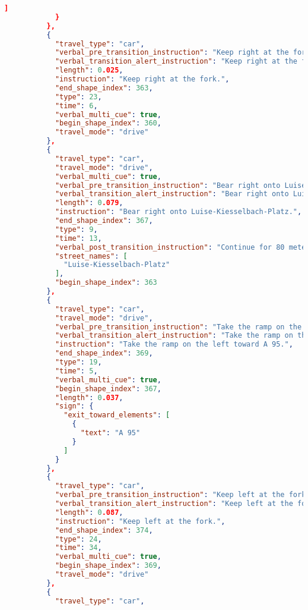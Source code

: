 \begin{lstlisting}[language=json,breaklines=true]
              ]
            }
          },
          {
            "travel_type": "car",
            "verbal_pre_transition_instruction": "Keep right at the fork. Then Bear right onto Luise-Kiesselbach-Platz.",
            "verbal_transition_alert_instruction": "Keep right at the fork.",
            "length": 0.025,
            "instruction": "Keep right at the fork.",
            "end_shape_index": 363,
            "type": 23,
            "time": 6,
            "verbal_multi_cue": true,
            "begin_shape_index": 360,
            "travel_mode": "drive"
          },
          {
            "travel_type": "car",
            "travel_mode": "drive",
            "verbal_multi_cue": true,
            "verbal_pre_transition_instruction": "Bear right onto Luise-Kiesselbach-Platz. Then Take the ramp on the left toward A 95.",
            "verbal_transition_alert_instruction": "Bear right onto Luise-Kiesselbach-Platz.",
            "length": 0.079,
            "instruction": "Bear right onto Luise-Kiesselbach-Platz.",
            "end_shape_index": 367,
            "type": 9,
            "time": 13,
            "verbal_post_transition_instruction": "Continue for 80 meters.",
            "street_names": [
              "Luise-Kiesselbach-Platz"
            ],
            "begin_shape_index": 363
          },
          {
            "travel_type": "car",
            "travel_mode": "drive",
            "verbal_pre_transition_instruction": "Take the ramp on the left toward A 95. Then Keep left at the fork.",
            "verbal_transition_alert_instruction": "Take the ramp on the left toward A 95.",
            "instruction": "Take the ramp on the left toward A 95.",
            "end_shape_index": 369,
            "type": 19,
            "time": 5,
            "verbal_multi_cue": true,
            "begin_shape_index": 367,
            "length": 0.037,
            "sign": {
              "exit_toward_elements": [
                {
                  "text": "A 95"
                }
              ]
            }
          },
          {
            "travel_type": "car",
            "verbal_pre_transition_instruction": "Keep left at the fork. Then Take the B 2 ramp on the left.",
            "verbal_transition_alert_instruction": "Keep left at the fork.",
            "length": 0.087,
            "instruction": "Keep left at the fork.",
            "end_shape_index": 374,
            "type": 24,
            "time": 34,
            "verbal_multi_cue": true,
            "begin_shape_index": 369,
            "travel_mode": "drive"
          },
          {
            "travel_type": "car",

\end{lstlisting}
